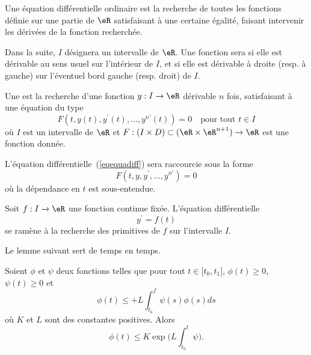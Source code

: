 
Une équation différentielle ordinaire est la recherche de toutes les fonctions définie sur une partie de $\eR$ satisfaisant à une certaine égalité, faisant intervenir les dérivées de la fonction recherchée.

Dans la suite, $I$ désignera un intervalle de $\eR$. Une fonction sera  si elle est dérivable au sens usuel sur l'intérieur de $I$, et si elle est dérivable à droite (resp. à gauche) sur l'éventuel bord gauche (resp. droit) de $I$.

\begin{definition}
  Une  est la recherche d'une fonction $y : I \to \eR$ dérivable $n$ fois, satisfaisant à une équation du type
  \begin{equation}\label{eqequadiff}
    F(t, y(t), y^\prime(t), \ldots, y^{n\prime}(t)) = 0 \quad \text{pour tout $t \in I$}
  \end{equation}
  où $I$ est un intervalle de $\eR$ et \begin{math}F : (I \times D) \subset (\eR\times\eR^{n+1})\to \eR\end{math} est une fonction donnée.
\end{definition}

\begin{remark}
L'équation différentielle~(\ref{eqequadiff}) sera raccourcie sous la forme
  \begin{equation}
    F(t, y, y^\prime, \ldots, y^{n\prime}) = 0
  \end{equation}
  où la dépendance en $t$ est sous-entendue.
\end{remark}

\begin{example}
	Soit $f : I \to \eR$ une fonction continue fixée. L'équation différentielle
	\begin{equation}
		y^\prime = f(t)
	\end{equation}
	se ramène à la recherche des primitives de $f$ sur l'intervalle $I$.
\end{example}

Le lemme suivant sert de temps en temps.
\begin{lemma} \label{LemuBVozy}
    Soient \( \phi\) et \( \psi\) deux fonctions telles que pour tout \( t\in\mathopen[ t_0 , t_1 \mathclose]\), \( \phi(t)\geq 0\), \( \psi(t)\geq 0\) et
    \begin{equation}
        \phi(t)\leq +L\int_{t_0}^f\psi(s)\phi(s)ds
    \end{equation}
    où \( K\) et \( L\) sont des constantes positives. Alors
    \begin{equation}
        \phi(t)\leq K\exp\big( L\int_{t_0}^t\psi \big).
    \end{equation}
\end{lemma}

